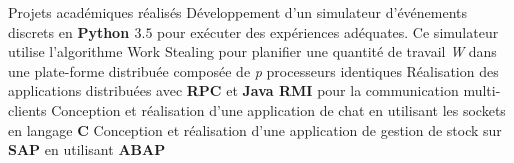 
\begin{rubric}{Projets académiques réalisés}
%
\entry*[]   Développement d'un simulateur d'événements discrets en \textbf{Python $3.5$} pour exécuter des expériences adéquates.
            Ce simulateur utilise l'algorithme Work Stealing pour planifier une quantité de travail \textit{W} dans une plate-forme distribuée composée de \textit{p} processeurs identiques
\entry*[]	Réalisation des applications distribuées avec \textbf{RPC} et \textbf{Java RMI} pour la communication multi-clients
\entry*[]	Conception et réalisation d’une application de chat en utilisant les sockets en langage \textbf{C}
\entry*[]	Conception et réalisation d’une application de gestion de stock sur \textbf{SAP} en utilisant \textbf{ABAP}
\end{rubric}
